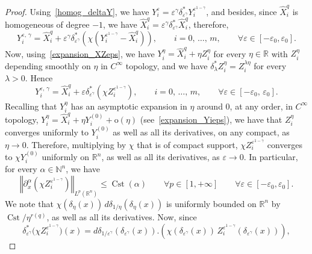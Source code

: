 \documentclass[AHL,Unicode,published]{cedram}
\newcommand*\R{\mathbb{R}}
\newcommand*\N{\mathbb{N}}
\newcommand{\rmo}{\mathrm{o}}
\DeclareMathOperator{\Cst}{Cst}
\renewcommand{\leq}{\leqslant}
\let\oldforall\forall
\renewcommand*{\forall}{\mathrel{\oldforall}}
\begin{document}
\begin{proof}
Using~\eqref{homog_deltaY}, we have $Y_i^{\varepsilon} = \varepsilon^\gamma \delta_{\varepsilon^\gamma}^* Y_i^{\varepsilon^{1-\gamma}}$, and besides, since $\widehat{X}_i^{q}$ is homogeneous of degree $-1$, we have $\widehat{X}_i^{q} = \varepsilon^\gamma \delta_{\varepsilon^\gamma}^*\widehat{X}_i^{q}$, therefore,
\begin{equation}\label{Yiepsgammaeps1mgam}
Y_i^{\varepsilon,\,\gamma} = \widehat{X}_i^{q} + \varepsilon^\gamma \delta_{\varepsilon^\gamma}^* \left(\chi \left(Y_i^{\varepsilon^{1-\gamma}} - \widehat{X}_i^{q} \right) \right),\qquad i=0,\,\ldots,\,m,\qquad \forall \varepsilon\in[-\varepsilon_0,\varepsilon_0].
\end{equation}
Now, using~\eqref{expansion_XZeps}, we have $Y_i^{\eta} = \widehat{X}_i^{q} + \eta Z_i^{\eta}$ for every $\eta\in\R$ with $Z_i^{\eta}$ depending smoothly on $\eta$ in $C^\infty$ topology, and we have $\delta_\lambda^* Z_i^{\eta} = Z_i^{\lambda\eta}$ for every $\lambda>0$. Hence
\[
Y_i^{\varepsilon,\,\gamma} = \widehat{X}_i^{q} + \varepsilon \delta_{\varepsilon^\gamma}^* \left(\chi Z_i^{\varepsilon^{1-\gamma}} \right),\qquad i=0,\,\ldots,\,m,\qquad \forall \varepsilon\in[-\varepsilon_0,\,\varepsilon_0].
\]
Recalling that $Y_i^\eta$ has an asymptotic expansion in $\eta$ around $0$, at any order, in $C^\infty$ topology, $Y_i^\eta = \widehat{X}_i^{q}+\eta Y_i^{(0)} + \rmo(\eta)$ (see~\eqref{expansion_Yieps}), we have that $Z_i^\eta$ converges uniformly to $Y_i^{(0)}$ as well as all its derivatives, on any compact, as $\eta\rightarrow 0$. Therefore, multiplying by $\chi$ that is of compact support, $\chi Z_i^{\varepsilon^{1-\gamma}}$ converges to $\chi Y_i^{(0)}$ uniformly on $\R^n$, as well as all its derivatives, as $\varepsilon\rightarrow 0$. In particular, for every $\alpha\in\N^n$, we have
\begin{equation}\label{bound_chiZ}
\left\Vert \partial_x^\alpha \left(\chi Z_i^{\varepsilon^{1-\gamma}} \right) \right\Vert_{L^p(\R^n)} \leq \Cst(\alpha) \qquad \forall p\in[1,+\infty]\qquad \forall \varepsilon\in[-\varepsilon_0,\varepsilon_0].
\end{equation}
We note that $\chi(\delta_\eta(x))\, d\delta_{1/\eta}(\delta_\eta(x))$ is uniformly bounded on $\R^n$ by $\Cst/\eta^{r(q)}$, as well as all its derivatives. Now, since
\[
\delta_{\varepsilon^\gamma}^* \big(\chi Z_i^{\varepsilon^{1-\gamma}} \big) (x) = d\delta_{1/\varepsilon^\gamma}(\delta_{\varepsilon^\gamma}(x)). \left(\chi(\delta_{\varepsilon^\gamma}(x)) \, Z_i^{\varepsilon^{1-\gamma}}(\delta_{\varepsilon^\gamma}(x)) \right),
\]
\end{proof}
\end{document}
